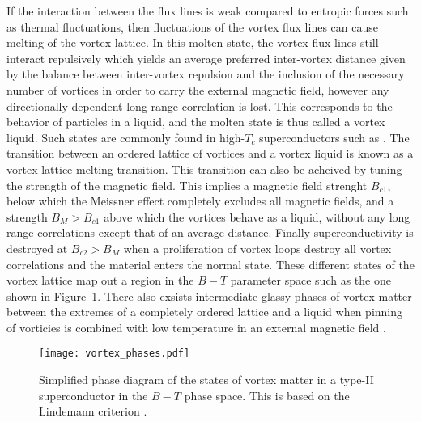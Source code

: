If the interaction between the flux lines is weak compared to entropic forces such as thermal fluctuations, then fluctuations of the vortex flux lines can cause melting of the vortex lattice.
In this molten state, the vortex flux lines still interact repulsively which yields an average preferred inter-vortex distance given by the balance between inter-vortex repulsion and the inclusion of the
necessary number of vortices in order to carry the external magnetic field, however any directionally dependent long range correlation is lost. This corresponds to the behavior
of particles in a liquid, and the molten state is thus called a vortex liquid. Such states are commonly found in high-$T_c$ superconductors such as .
The transition between an ordered lattice of vortices and a vortex liquid is known as a vortex lattice melting transition.
This transition can also be acheived by tuning the strength of the magnetic field. This implies a magnetic field strenght $B_{c1}$, below which the Meissner effect
completely excludes all magnetic fields, and a strength $B_{M}>B_{c1}$ above which the vortices behave as a liquid, \ie without any long range correlations except that of an average distance.
Finally superconductivity is destroyed at $B_{c2}>B_M$ when a proliferation of vortex loops destroy all vortex correlations and the material enters the normal state.
These different states of the vortex lattice map out a region in the $B-T$ parameter space such as the one shown in Figure~\ref{fig:Vor:phases}.
There also exsists intermediate glassy phases of vortex matter between the extremes of a completely ordered lattice and a liquid when pinning of vorticies is combined
with low temperature in an external magnetic field \cite{Sanchez19,Koch89}.

\begin{figure}[t]
    \centering
    \texttt{[image: vortex\_phases.pdf]}
    \caption{Simplified phase diagram of the states of vortex matter in a type-II superconductor in the $B-T$ phase space. This is based on the Lindemann criterion \cite{Sonier98}.}
    \label{fig:Vor:phases}
\end{figure}

